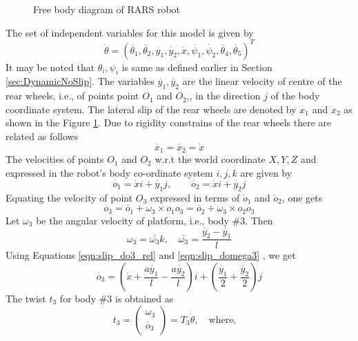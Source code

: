 {\begin{figure}
	\caption{Free body diagram of RARS robot}
	\label{fig:VehicleWithSlip}
\end{figure}

The set of independent variables for this model is given by
\begin{equation}
\label{eqn:theta_slip}
\dot{\theta}=(\dot{\theta_1},\dot{\theta_2}, \dot{y_1},\dot{y_2},\dot{x},\dot{\psi_1},\dot{\psi_2},\dot{\theta_4},\dot{\theta_5})^T
\end{equation}
It may be noted that $\theta_i,\psi_i$  is same as defined earlier in Section \ref{sec:DynamicNoSlip}. The variables $\dot{y_1},\dot{y_2}$ are the linear velocity of centre of the rear wheels, i.e., of points point $O_1$ and $O_2$,, in the direction $j$ of the body coordinate system. The lateral slip of the rear wheels are denoted by $x_1$ and $x_2$ as shown in the Figure \ref{fig:VehicleWithSlip}. Due to rigidity constrains of the rear wheels there are related as follows
\[\dot{x_1}=\dot{x_2}=\dot{x}\] 
The velocities of points $O_1$ and $ O_2$ w.r.t the world coordinate ${X,Y,Z}$ and expressed in the robot's body co-ordinate system ${i,j,k}$ are given by 
\begin{equation}
\label{eqn:slip_do1}
\dot{o_1}=\dot{x}i +\dot{y_1}j, \quad \quad  \dot{o_2}=\dot{x}i +\dot{y_2}j
\end{equation}
Equating the velocity of point $O_3$ expressed in terms of $\dot o_1$ and $\dot o_2$, one gets
\begin{equation}
\label{eqn:slip_do3_rel}
\dot{o_3}=\dot{o_1}+\omega_3\times o_1o_3=\dot{o_2}+\omega_3\times o_2o_3
\end{equation}
Let $\omega_3$ be the angular velocity of platform, i.e., body \#3. Then 
\begin{equation}
	\label{eqn:slip_domega3}
	\omega_3=\bar{\omega_3}k, \quad \bar{\omega_3}=\frac{\dot{y_2}-\dot{y_1}}{l} 
\end{equation}
Using Equations \ref{eqn:slip_do3_rel} and \ref{eqn:slip_domega3} , we get
\begin{equation}
\label{eqn:slip_do3}
\dot{o_3}=(\dot{x}+\frac{a\dot{y_1}}{l}-\frac{a \dot{y_2}}{l})i+(\frac{\dot{y_1}}{2}+\frac{\dot{y_2}}{2})j
\end{equation}
The twist $t_3$ for body \#3 is obtained as
\begin{equation}
\label{eqn:slip_t3}
t_3=
\begin{pmatrix}
\omega_3\\
\dot{o_3}
\end{pmatrix}=T_3 \dot{\theta}, \quad \text{where,} \quad 

\end{equation}}

